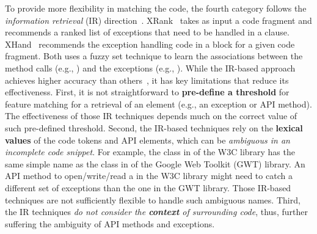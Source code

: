 To provide more flexibility in matching the code, the fourth category
follows the {\em information retrieval} (IR)
direction~\cite{xrank-fse20}. XRank~\cite{xrank-fse20} takes as input
a code fragment and recommends a ranked list of exceptions that need
to be handled in a  clause. XHand~\cite{xrank-fse20}
recommends the exception handling code in a  block for a
given code fragment. Both uses a fuzzy set technique to learn the
associations between the method calls (e.g.,
) and the exceptions (e.g.,
). While the IR-based approach achieves higher
accuracy than others~\cite{xrank-fse20}, it has key limitations
that reduce its effectiveness. First, it is not straightforward to {\bf
  pre-define a threshold} for feature matching for a retrieval of an
element (e.g., an exception or API method). The effectiveness of those
IR techniques depends much on the correct value of such pre-defined
threshold. Second, the IR-based techniques rely on the {\bf lexical
  values} of the code tokens and API elements, which can be {\em
  ambiguous in an incomplete code snippet}. For example, the
 class in  of the W3C library has
the same simple name as the  class in
 of the Google Web
Toolkit (GWT) library. An API method to open/write/read a
 in the W3C library might need to catch a different set
of exceptions than the one in the GWT library. Those IR-based
techniques are not sufficiently flexible to handle such ambiguous
names. Third, the IR techniques {\em do not consider the {\bf context} of
  surrounding code}, thus, further suffering the ambiguity of
API methods and exceptions.
